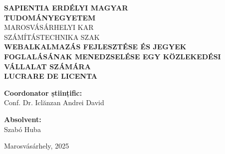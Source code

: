 \begin{titlepage}
    \centering
    \vspace*{2cm}

    {\Large \textbf{SAPIENTIA ERDÉLYI MAGYAR}}\\[0.2cm]
    {\Large \textbf{TUDOMÁNYEGYETEM}}\\[0.5cm]
    {\large MAROSVÁSÁRHELYI KAR}\\[0.2cm]
    {\large SZÁMÍTÁSTECHNIKA SZAK}\\[3cm]

    {\LARGE \textbf{WEBALKALMAZÁS FEJLESZTÉSE ÉS JEGYEK FOGLALÁSÁNAK MENEDZSELÉSE EGY KÖZLEKEDÉSI VÁLLALAT SZÁMÁRA}}\\[0.5cm] 
    {\Large \textbf{LUCRARE DE LICENTA}}\\[4cm]

    \noindent
    \begin{minipage}[t]{0.48\textwidth}
        \raggedright
        \textbf{Coordonator științific:}\\[1em]
        Conf. Dr. Iclănzan Andrei David
    \end{minipage}
    \hfill
    \begin{minipage}[t]{0.48\textwidth}
        \raggedleft
        \textbf{Absolvent:}\\[1em]
        Szabó Huba
    \end{minipage}


    \vfill

    {\large Marosvásárhely, 2025}

\end{titlepage}

